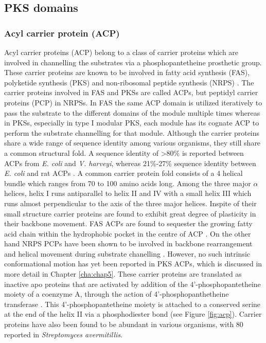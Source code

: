 		\subsection{PKS domains}
			\subsubsection{Acyl carrier protein (ACP)}
			\label{sec: ACP}
			Acyl carrier proteins (ACP) belong to a class of carrier proteins which are involved in channelling the substrates via a phosphopantetheine prosthetic group. These carrier proteins are known to be involved in fatty acid synthesis (FAS), polyketide synthesis (PKS) and non-ribosomal peptide synthesis (NRPS) . The carrier proteins involved in FAS and PKSs are called ACPs, but peptidyl carrier proteins (PCP)  in NRPSs. In FAS the same ACP domain is utilized iteratively to pass the substrate to the different domains of the module multiple times whereas in PKSs, especially in type I modular PKS, each module has its cognate ACP to perform the substrate channelling for that module. Although the carrier proteins share a wide range of sequence identity among various organisms, they still share a common structural fold. A sequence identity of \textgreater80\% is reported between ACPs from \textit{E. coli} and \textit{V. harveyi}, whereas 21\%-27\% sequence identity between \textit{E. coli} and rat ACPs \parencite{Byers2007}.  A common carrier protein fold consists of a 4 helical bundle which ranges from 70 to 100 amino acids long. Among the three major $\alpha$ helices, helix I runs antiparallel to helix II and IV with a small helix III which runs almost perpendicular to the axis of the three major helices. Inspite of their small structure carrier proteins are found to exhibit great degree of plasticity in their backbone movement. FAS ACPs are found to sequester the growing fatty acid chain within the hydrophobic pocket in the centre of ACP \parencite{Chan2008}. On the other hand NRPS PCPs have been shown to be involved in backbone rearrangement and helical movement during substrate chanelling \parencite{Koglin2006}. However, no such intrinsic conformational motion has yet been reported in PKS ACPs, which is discussed in more detail in Chapter \ref{cha:chap5}. These carrier proteins are translated as inactive apo proteins that are activated by addition of the 4\textquoteright-phosphopantetheine moiety of a coenzyme A, through the action of 4\textquoteright-phosphopanthetheine transferase \parencite{Mootz2001}. This 4\textquoteright-phosphopantetheine moiety is attached to a conserved serine at the end of the helix II via a phosphodiester bond (see Figure \ref{fig:acp}). Carrier proteins have also been found to be abundant in various organisms, with 80 reported in \textit{Streptomyces avermitillis}.
					
